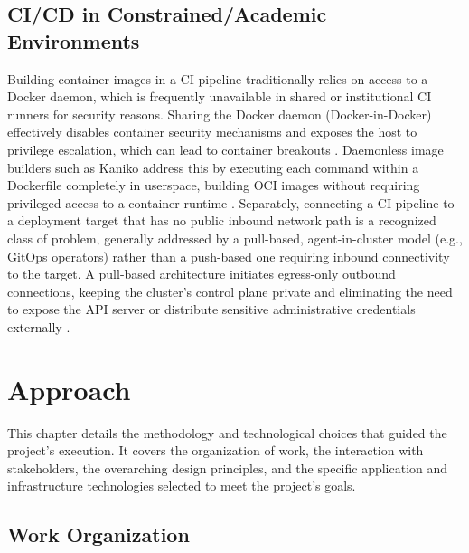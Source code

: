 \documentclass[twoside]{supsistudent}
\begin{document}
\section{CI/CD in Constrained/Academic Environments}
Building container images in a CI pipeline traditionally relies on access to a Docker daemon, which is frequently unavailable in shared or institutional CI runners for security reasons. Sharing the Docker daemon (Docker-in-Docker) effectively disables container security mechanisms and exposes the host to privilege escalation, which can lead to container breakouts \cite{petazzoni2015dind, gitlab2024docker}. Daemonless image builders such as Kaniko address this by executing each command within a Dockerfile completely in userspace, building OCI images without requiring privileged access to a container runtime \cite{kaniko2025, gitlab2024docker}. Separately, connecting a CI pipeline to a deployment target that has no public inbound network path is a recognized class of problem, generally addressed by a pull-based, agent-in-cluster model (e.g., GitOps operators) rather than a push-based one requiring inbound connectivity to the target. A pull-based architecture initiates egress-only outbound connections, keeping the cluster's control plane private and eliminating the need to expose the API server or distribute sensitive administrative credentials externally \cite{plural2025pullpush}.

\chapter{Approach}
This chapter details the methodology and technological choices that guided the project's execution. It covers the organization of work, the interaction with stakeholders, the overarching design principles, and the specific application and infrastructure technologies selected to meet the project's goals.

\section{Work Organization}
\end{document}
